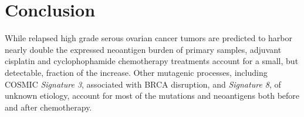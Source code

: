 \section*{Conclusion}
While relapsed high grade serous ovarian cancer tumors are predicted to harbor nearly double the expressed neoantigen burden of primary samples, adjuvant cisplatin and cyclophophamide chemotherapy treatments account for a small, but detectable, fraction of the increase. Other mutagenic processes, including COSMIC \textit{Signature 3}, associated with BRCA disruption, and \textit{Signature 8}, of unknown etiology, account for most of the mutations and neoantigens both before and after chemotherapy.